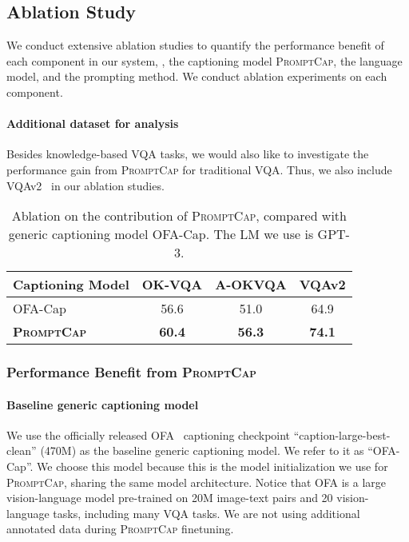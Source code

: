 \documentclass[10pt,twocolumn,letterpaper]{article}
\newcommand{\NAME}{\textsc{PromptCap}\xspace}
\begin{document}
\subsection{Ablation Study}
\label{sec:exp:ablation}
We conduct extensive ablation studies to quantify the performance benefit of each component in our system,
\ie, the captioning model \NAME, the language model, and the prompting method. We conduct ablation experiments on each component. 


\vspace{-0.1in}
\paragraph{Additional dataset for analysis} Besides knowledge-based VQA tasks, we would also like to investigate the performance gain from \NAME for traditional VQA. 
Thus, we also include VQAv2~\cite{antol2015vqa} in our ablation studies.


\begin{table}[th]
\small
\centering
\caption{
Ablation on the contribution of \NAME, compared with generic captioning model OFA-Cap. The LM we use is GPT-3.
}
\begin{tabular}{l|ccc}
\toprule[1.2pt]
Captioning Model & OK-VQA & A-OKVQA & VQAv2 \\
\midrule
OFA-Cap  & 56.6 & 51.0 & 64.9 \\
\textbf{\NAME} & \textbf{60.4} & \textbf{56.3} & \textbf{74.1} \\

\bottomrule[1.2pt]
\end{tabular}
\vspace{-0.1in}
\label{tab:ablation}
\end{table} 


\vspace{-0.1in}
\subsubsection{Performance Benefit from \NAME}


\paragraph{Baseline generic captioning model} We use the officially released OFA~\cite{wang2022ofa} captioning checkpoint ``caption-large-best-clean'' (470M) as the baseline generic captioning model. We refer to it as ``OFA-Cap''. We choose this model because this is the model initialization we use for \NAME, sharing the same model architecture. Notice that OFA is a large vision-language model pre-trained on 20M image-text pairs and 20 vision-language tasks, including many VQA tasks. We are not using additional annotated data during \NAME finetuning.
\end{document}
